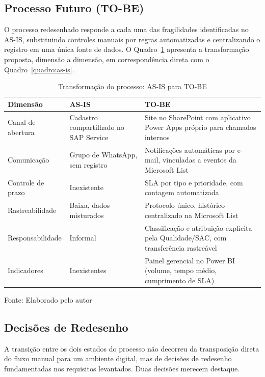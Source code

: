 \subsection{Processo Futuro (TO-BE)}

O processo redesenhado responde a cada uma das fragilidades
identificadas no AS-IS, substituindo controles manuais por
regras automatizadas e centralizando o registro em uma única
fonte de dados. O Quadro~\ref{quadro:to-be} apresenta a
transformação proposta, dimensão a dimensão, em correspondência
direta com o Quadro~\ref{quadro:as-is}.

\begin{table}[H]
\caption{Transformação do processo: AS-IS para TO-BE}
\label{quadro:to-be}
\centering
\begin{tabular}{p{3.0cm} p{4.9cm} p{4.9cm}}
\hline
\textbf{Dimensão} & \textbf{AS-IS} & \textbf{TO-BE} \\
\hline
Canal de abertura & Cadastro compartilhado no SAP Service &
Site no SharePoint com aplicativo Power Apps próprio para
chamados internos \\
\hline
Comunicação & Grupo de WhatsApp, sem registro & Notificações
automáticas por e-mail, vinculadas a eventos da Microsoft
List \\
\hline
Controle de prazo & Inexistente & SLA por tipo e prioridade,
com contagem automatizada \\
\hline
Rastreabilidade & Baixa, dados misturados & Protocolo único,
histórico centralizado na Microsoft List \\
\hline
Responsabilidade & Informal & Classificação e atribuição
explícita pela Qualidade/SAC, com transferência rastreável \\
\hline
Indicadores & Inexistentes & Painel gerencial no Power BI
(volume, tempo médio, cumprimento de SLA) \\
\hline
\end{tabular}
\raggedright
\par
{\fontsize{10}{12}\selectfont Fonte: Elaborado pelo autor}
\end{table}

\subsection{Decisões de Redesenho}

A transição entre os dois estados do processo não decorreu da
transposição direta do fluxo manual para um ambiente digital,
mas de decisões de redesenho fundamentadas nos requisitos
levantados. Duas decisões merecem destaque.

